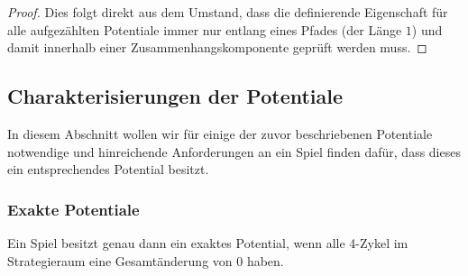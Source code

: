 \begin{proof}
	Dies folgt direkt aus dem Umstand, dass die definierende Eigenschaft für alle aufgezählten Potentiale immer nur entlang eines Pfades (der Länge $1$) und damit innerhalb einer Zusammenhangskomponente geprüft werden muss.
\end{proof}


\subsection{Charakterisierungen der Potentiale}\label{sec:Potentiale:Charakterisierungen}

In diesem Abschnitt wollen wir für einige der zuvor beschriebenen Potentiale notwendige und hinreichende Anforderungen an ein Spiel finden dafür, dass dieses ein entsprechendes Potential besitzt.

\subsubsection{Exakte Potentiale}

\begin{satz}\label{satz:CharExPot}
	Ein Spiel besitzt genau dann ein exaktes Potential, wenn alle 4-Zykel im Strategieraum eine Gesamtänderung von $0$ haben.
\end{satz}

